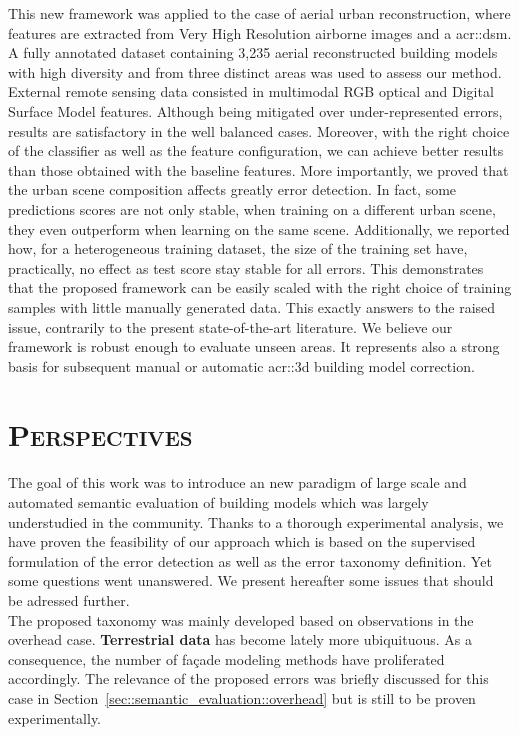     This new framework was applied to the case of aerial urban reconstruction, where features are extracted from Very High Resolution airborne images and a \acrlong{acr::dsm}.
    A fully annotated dataset containing 3,235 aerial reconstructed building models with high diversity and from three distinct areas was used to assess our method.
    External remote sensing data consisted in multimodal RGB optical and Digital Surface Model features.
    Although being mitigated over under-represented errors, results are satisfactory in the well balanced cases.
    Moreover, with the right choice of the classifier as well as the feature configuration, we can achieve better results than those obtained with the baseline features.
    More importantly, we proved that the urban scene composition affects greatly error detection.
    In fact, some predictions scores are not only stable, when training on a different urban scene, they even outperform when learning on the same scene.
    Additionally, we reported how, for a heterogeneous training dataset, the size of the training set have, practically, no effect as test score stay stable for all errors.
    This demonstrates that the proposed framework can be easily scaled with the right choice of training samples with little manually generated data.
    This exactly answers to the raised issue, contrarily to the present state-of-the-art literature.
    We believe our framework is robust enough to evaluate unseen areas.
    It represents also a strong basis for subsequent manual or automatic \gls{acr::3d} building model correction.

\section{\textsc{Perspectives}}
    \label{sec::conclusion::perspectives}
    The goal of this work was to introduce an new paradigm of large scale and automated semantic evaluation of building models which was largely understudied in the community.
    Thanks to a thorough experimental analysis, we have proven the feasibility of our approach which is based on the supervised formulation of the error detection as well as the error taxonomy definition.
    Yet some questions went unanswered.
    We present hereafter some issues that should be adressed further.\\

    The proposed taxonomy was mainly developed based on observations in the overhead case.
    \textbf{Terrestrial data} has become lately more ubiquituous.
    As a consequence, the number of façade modeling methods have proliferated accordingly.
    The relevance of the proposed errors was briefly discussed for this case in Section~\ref{sec::semantic_evaluation::overhead} but is still to be proven experimentally.\\

